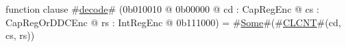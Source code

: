 function clause #\hyperref[zdecode]{decode}# (0b010010 @ 0b00000 @ cd : CapRegEnc @ cs : CapRegOrDDCEnc @ rs : IntRegEnc @ 0b111000) = #\hyperref[zSome]{Some}#(#\hyperref[zCLCNT]{CLCNT}#(cd, cs, rs))
